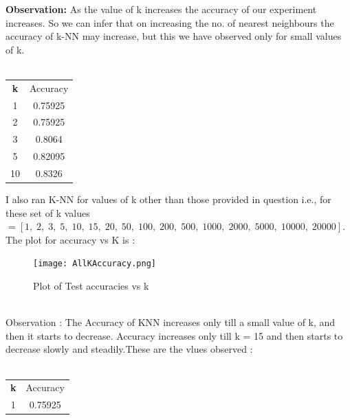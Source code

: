 \documentclass[a4paper,11pt]{article}
\begin{document}
\begin{mlsolution}
\textbf{Observation:} As the value of k increases the accuracy of our experiment increases. So we can infer that on increasing the no. of nearest neighbours the accuracy of k-NN may increase, but this we have observed only for small values of k. \\\\

\begin{center}
 \begin{tabular}{|c|c|} 
 \hline
 \textbf{k} & Accuracy \\ [0.5ex] 
 
 1 & 0.75925 \\ 
 
 2 & 0.75925   \\
 
 3 & 0.8064   \\
 
 5 & 0.82095   \\
 
 10 & 0.8326   \\ [1ex] 
 \hline
\end{tabular}
\end{center}


I also ran K-NN for values of k other than those provided in question i.e., for these set of k values\begin{math} = \left [1,\; 2,\; 3,\; 5,\; 10,\; 15,\; 20,\; 50,\; 100,\; 200,\; 500,\; 1000,\; 2000,\; 5000,\; 10000,\; 20000 \right ].\end{math} The plot for accuracy vs K is :

\begin{figure}[th]%
\centering
\texttt{[image: AllKAccuracy.png]}%
\caption{Plot of Test accuracies vs k }%
\label{fig:accuracyallK}%
\end{figure}\\

Observation : The Accuracy of KNN increases only till a small value of k, and then it starts to decrease. Accuracy increases only till k = 15 and then starts to decrease slowly and steadily.These are the vlues observed : \\\\

\begin{center}
 \begin{tabular}{|c|c|} 
 \hline
 \textbf{k} & Accuracy \\ [0.5ex] 
 
 1 & 0.75925 \\ 
 

\end{tabular}
\end{center}
\end{mlsolution}
\end{document}
